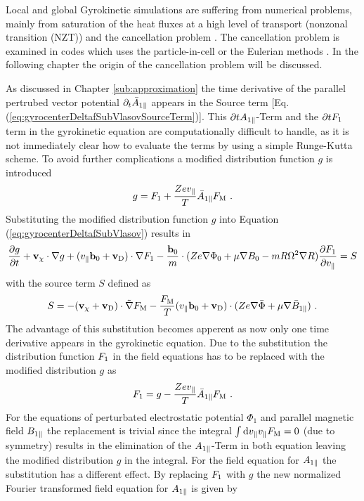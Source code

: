 Local and global Gyrokinetic simulations are suffering from numerical problems, mainly from saturation of the heat fluxes at a high level of transport (nonzonal transition (NZT)) and the cancellation problem \cite{Chen2001}. The cancellation problem is examined in codes which uses the particle-in-cell or the Eulerian methods \cite{Cummings_PHD}. In the following chapter the origin of the cancellation problem will be discussed.\bigskip

As discussed in Chapter \ref{sub:approximation} the time derivative of the parallel pertrubed vector potential $\partial_t \bar{A}_{1\parallel}$ appears in the Source term [Eq. (\ref{eq:gyrocenterDeltafSubVlasovSourceTerm})]. This $\partial t A_{1\parallel}$-Term and the $\partial t F_1$ term in the gyrokinetic equation are computationally difficult to handle, as it is not immediately clear how to evaluate the terms by using a simple Runge-Kutta scheme. To avoid further complications a modified distribution function $g$ is introduced
\begin{gather}
	g = F_1 + \frac{Ze v_\parallel}{T} \bar{A}_{1\parallel} F_\mathrm{M} ~.
	\label{eq:modifiedDistributionFunction}
\end{gather}
Substituting the modified distribution function $g$ into Equation (\ref{eq:gyrocenterDeltafSubVlasov}) results in
\begin{gather}
	\frac{\partial g}{\partial t} + \boldsymbol{\mathbf{v}}_\chi \cdot \nabla g + (v_\parallel \boldsymbol{\mathbf{b}}_0 + \boldsymbol{\mathbf{v}}_\mathrm{D}) \cdot \nabla F_1 - \frac{\boldsymbol{\mathbf{b}}_0}{m} \cdot (Z e \nabla \Phi_0 + \mu \nabla B_0 - m R \Omega^2 \nabla R) \frac{\partial F_1}{\partial v_\parallel} = S
	\label{eq:modifiedGyrocenterDeltafSubVlasov}
\end{gather}
with the source term $S$ defined as
\begin{gather}
	S = - (\boldsymbol{\mathbf{v}}_\chi + \boldsymbol{\mathbf{v}}_\mathrm{D}) \cdot \tilde{\nabla} F_\mathrm{M} - \frac{F_\mathrm{M}}{T} (v_\parallel \boldsymbol{\mathbf{b}}_0 + \boldsymbol{\mathbf{v}}_\mathrm{D}) \cdot (Ze \nabla \bar{\Phi} + \mu \nabla \bar{B}_{1\parallel}) ~.
	\label{eq:modifiedSourceTerm}
\end{gather}
The advantage of this substitution becomes apperent as now only one time derivative appears in the gyrokinetic equation. Due to the substitution the distribution function $F_1$ in the field equations has to be replaced with the modified distribution $g$ as
\begin{gather}
	F_1 = g - \frac{Ze v_\parallel}{T} \bar{A}_{1\parallel} F_\mathrm{M} ~.
\end{gather}
For the equations of perturbated electrostatic potential $\Phi_1$ and parallel magnetic field $B_{1\parallel}$ the replacement is trivial since the integral $\int \mathrm{d}v_\parallel v_\parallel F_\mathrm{M} = 0$ (due to symmetry) results in the elimination of the $A_{1\parallel}$-Term in both equation leaving the modified distribution $g$ in the integral. For the field equation for $A_{1\parallel}$ the substitution has a different effect. By replacing $F_1$ with $g$ the new normalized Fourier transformed field equation for $A_{1\parallel}$ is given by
